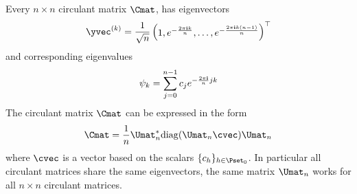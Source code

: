 \begin{theorem} \label{theorem:ch2-diagonalization_circulant_matrix}
  Every $n \times n$ circulant matrix $\Cmat$, has eigenvectors  
  \begin{equation}
    \yvec^{(k)} = \frac{1}{\sqrt{n}} \leftmatrix 1, e^{-\frac{2 \pi \ci k}{n}}, \dots, e^{-\frac{2 \pi \ci k(n-1)}{n}} \rightmatrix^\top
  \end{equation}
  and corresponding eigenvalues
  \begin{equation}
    \psi_k = \sum_{j=0}^{n-1} c_j e^{-\frac{2 \pi \mathbf{i}}{n} jk}
  \end{equation}
  The circulant matrix $\Cmat$ can be expressed in the form 
  \begin{equation} \label{equation:ch2-diagonalization_circulant_matrix}
    \Cmat = \frac{1}{n} \Umat_n^* \diag(\Umat_n \cvec) \Umat_n
  \end{equation}
  where $\cvec$ is a vector based on the scalars $\{c_h\}_{h \in \Pset_0}$.
  In particular all circulant matrices share the same eigenvectors, the same matrix $\Umat_n$ works for all $n \times n$ circulant matrices.
\end{theorem}



\begingroup
\allowdisplaybreaks


